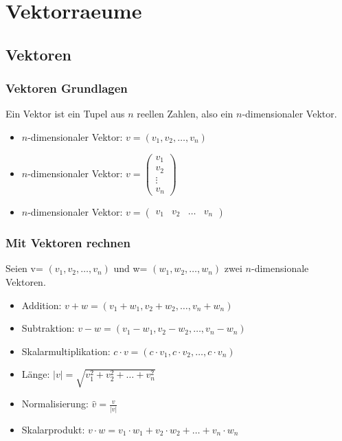 \section{Vektorraeume}

\subsection{Vektoren}
\begin{frame}
    \frametitle{Vektoren Grundlagen}
    Ein Vektor ist ein Tupel aus $n$ reellen Zahlen, also ein $n$-dimensionaler Vektor.
    \begin{itemize}
        \item $n$-dimensionaler Vektor: $v = (v_1, v_2, \dots, v_n)$
        \item $n$-dimensionaler Vektor: $v = \begin{pmatrix}
                                                 v_1 \\ v_2 \\ \vdots \\ v_n
        \end{pmatrix}$
        \item $n$-dimensionaler Vektor: $v = \begin{pmatrix}
                                                 v_1 & v_2 & \dots & v_n
        \end{pmatrix}$
    \end{itemize}
\end{frame}

\begin{frame}
    \frametitle{Mit Vektoren rechnen}
    Seien v= $(v_1, v_2, \dots, v_n)$ und w= $(w_1, w_2, \dots, w_n)$ zwei $n$-dimensionale Vektoren.
    \begin{itemize}
        \item Addition: $v + w = (v_1 + w_1, v_2 + w_2, \dots, v_n + w_n)$
        \item Subtraktion: $v - w = (v_1 - w_1, v_2 - w_2, \dots, v_n - w_n)$
        \item Skalarmultiplikation: $c \cdot v = (c \cdot v_1, c \cdot v_2, \dots, c \cdot v_n)$
        \item Länge: $|v| = \sqrt{v_1^2 + v_2^2 + \dots + v_n^2}$
        \item Normalisierung: $\hat{v} = \frac{v}{|v|}$
        \item Skalarprodukt: $v \cdot w = v_1 \cdot w_1 + v_2 \cdot w_2 + \dots + v_n \cdot w_n$
    \end{itemize}
\end{frame}

